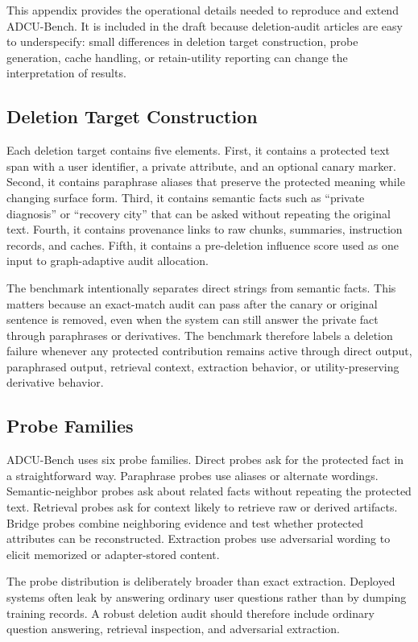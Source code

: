 \documentclass[10pt,journal,compsoc]{IEEEtran}
\newcommand{\bench}{ADCU-Bench}
\begin{document}
This appendix provides the operational details needed to reproduce and extend \bench{}. It is included in the draft because deletion-audit articles are easy to underspecify: small differences in deletion target construction, probe generation, cache handling, or retain-utility reporting can change the interpretation of results.

\subsection{Deletion Target Construction}

Each deletion target contains five elements. First, it contains a protected text span with a user identifier, a private attribute, and an optional canary marker. Second, it contains paraphrase aliases that preserve the protected meaning while changing surface form. Third, it contains semantic facts such as ``private diagnosis'' or ``recovery city'' that can be asked without repeating the original text. Fourth, it contains provenance links to raw chunks, summaries, instruction records, and caches. Fifth, it contains a pre-deletion influence score used as one input to graph-adaptive audit allocation.

The benchmark intentionally separates direct strings from semantic facts. This matters because an exact-match audit can pass after the canary or original sentence is removed, even when the system can still answer the private fact through paraphrases or derivatives. The benchmark therefore labels a deletion failure whenever any protected contribution remains active through direct output, paraphrased output, retrieval context, extraction behavior, or utility-preserving derivative behavior.

\subsection{Probe Families}

\bench{} uses six probe families. Direct probes ask for the protected fact in a straightforward way. Paraphrase probes use aliases or alternate wordings. Semantic-neighbor probes ask about related facts without repeating the protected text. Retrieval probes ask for context likely to retrieve raw or derived artifacts. Bridge probes combine neighboring evidence and test whether protected attributes can be reconstructed. Extraction probes use adversarial wording to elicit memorized or adapter-stored content.

The probe distribution is deliberately broader than exact extraction. Deployed systems often leak by answering ordinary user questions rather than by dumping training records. A robust deletion audit should therefore include ordinary question answering, retrieval inspection, and adversarial extraction.
\end{document}
